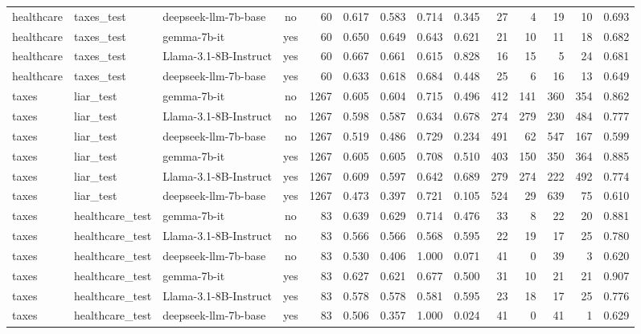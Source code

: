 \begin{landscape}
\begin{longtable}{@{}l l p{3.6cm} c r r r r r r r r r r@{}}
healthcare & taxes\_test     & deepseek-llm-7b-base  & no  &   60 & 0.617 & 0.583 & 0.714 & 0.345 &  27 &   4 &  19 &  10 & 0.693 \\
healthcare & taxes\_test     & gemma-7b-it           & yes &   60 & 0.650 & 0.649 & 0.643 & 0.621 &  21 &  10 &  11 &  18 & 0.682 \\
healthcare & taxes\_test     & Llama-3.1-8B-Instruct & yes &   60 & 0.667 & 0.661 & 0.615 & 0.828 &  16 &  15 &   5 &  24 & 0.681 \\
healthcare & taxes\_test     & deepseek-llm-7b-base  & yes &   60 & 0.633 & 0.618 & 0.684 & 0.448 &  25 &   6 &  16 &  13 & 0.649 \\
taxes      & liar\_test      & gemma-7b-it           & no  & 1267 & 0.605 & 0.604 & 0.715 & 0.496 & 412 & 141 & 360 & 354 & 0.862 \\
taxes      & liar\_test      & Llama-3.1-8B-Instruct & no  & 1267 & 0.598 & 0.587 & 0.634 & 0.678 & 274 & 279 & 230 & 484 & 0.777 \\
taxes      & liar\_test      & deepseek-llm-7b-base  & no  & 1267 & 0.519 & 0.486 & 0.729 & 0.234 & 491 &  62 & 547 & 167 & 0.599 \\
taxes      & liar\_test      & gemma-7b-it           & yes & 1267 & 0.605 & 0.605 & 0.708 & 0.510 & 403 & 150 & 350 & 364 & 0.885 \\
taxes      & liar\_test      & Llama-3.1-8B-Instruct & yes & 1267 & 0.609 & 0.597 & 0.642 & 0.689 & 279 & 274 & 222 & 492 & 0.774 \\
taxes      & liar\_test      & deepseek-llm-7b-base  & yes & 1267 & 0.473 & 0.397 & 0.721 & 0.105 & 524 &  29 & 639 &  75 & 0.610 \\
taxes      & healthcare\_test & gemma-7b-it          & no  &   83 & 0.639 & 0.629 & 0.714 & 0.476 &  33 &   8 &  22 &  20 & 0.881 \\
taxes      & healthcare\_test & Llama-3.1-8B-Instruct& no  &   83 & 0.566 & 0.566 & 0.568 & 0.595 &  22 &  19 &  17 &  25 & 0.780 \\
taxes      & healthcare\_test & deepseek-llm-7b-base & no  &   83 & 0.530 & 0.406 & 1.000 & 0.071 &  41 &   0 &  39 &   3 & 0.620 \\
taxes      & healthcare\_test & gemma-7b-it          & yes &   83 & 0.627 & 0.621 & 0.677 & 0.500 &  31 &  10 &  21 &  21 & 0.907 \\
taxes      & healthcare\_test & Llama-3.1-8B-Instruct& yes &   83 & 0.578 & 0.578 & 0.581 & 0.595 &  23 &  18 &  17 &  25 & 0.776 \\
taxes      & healthcare\_test & deepseek-llm-7b-base & yes &   83 & 0.506 & 0.357 & 1.000 & 0.024 &  41 &   0 &  41 &   1 & 0.629 \\

\end{longtable}
\end{landscape}
